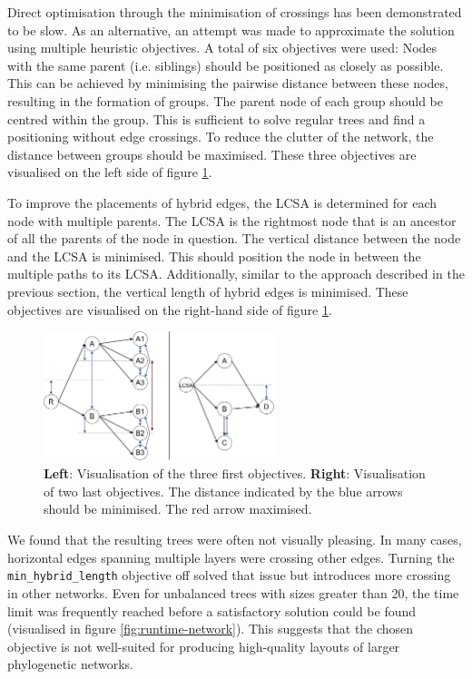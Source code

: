 \documentclass{article}
\begin{document}
Direct optimisation through the minimisation of crossings has been demonstrated to be slow. As an alternative, an attempt was made to approximate the solution using multiple heuristic objectives. A total of six objectives were used: 
Nodes with the same parent (i.e. siblings) should be positioned as closely as possible. This can be achieved by minimising the pairwise distance between these nodes, resulting in the formation of groups. The parent node of each group should be centred within the group. This is sufficient to solve regular trees and find a positioning without edge crossings.
To reduce the clutter of the network, the distance between groups should be maximised. These three objectives are visualised on the left side of figure \ref{fig:objective}.

To improve the placements of hybrid edges, the \ac{LCSA} is determined for each node with multiple parents. The \ac{LCSA} is the rightmost node that is an ancestor of all the parents of the node in question. The vertical distance between the node and the \ac{LCSA} is minimised.  This should position the node in between the multiple paths to its \ac{LCSA}. Additionally, similar to the approach described in the previous section, the vertical length of hybrid edges is minimised. These objectives are visualised on the right-hand side of figure \ref{fig:objective}.
\begin{figure}[H]
    \centering
    \includegraphics[width=0.6\textwidth]{figures/objective.pdf}
    \caption{\textbf{Left}: Visualisation of the three first objectives. \textbf{Right}: Visualisation of two last objectives. The distance indicated by the blue arrows should be minimised. The red arrow maximised.}
    \label{fig:objective}
\end{figure}
We found that the resulting trees were often not visually pleasing. In many cases, horizontal edges spanning multiple layers were crossing other edges. Turning the \texttt{min\_hybrid\_length} objective off solved that issue but introduces more crossing in other networks. 
Even for unbalanced trees with sizes greater than 20, the time limit was frequently reached before a satisfactory solution could be found (visualised in figure \ref{fig:runtime-network}).
This suggests that the chosen objective is not well-suited for producing high-quality layouts of larger phylogenetic networks.
\end{document}
